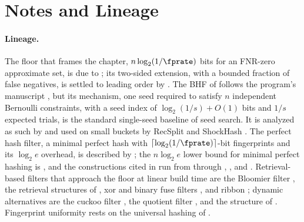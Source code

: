 %

\section{Notes and Lineage}
\label{sec:bib-notes-ch14}

\paragraph{Lineage.}
The floor that frames the chapter, $n \log_2(1/\fprate)$ bits for an
FNR-zero approximate set, is due to \textcite{carter-et-al-1978}; its
two-sided extension, with a bounded fraction of false negatives, is
settled to leading order by \textcite[Prop.~1]{pagh-rodler-2001}. The
BHF of  follows the program's manuscript
\parencite{towell-bernoulli-hash-function}, but its mechanism, one seed
required to satisfy $n$ independent Bernoulli constraints, with a seed
index of $\log_2(1/s) + O(1)$ bits and $1/s$ expected trials, is the
standard single-seed baseline of seed search. It is analyzed as such by
\textcite[Sec.~1.1]{lehmann-et-al-2025} and used on small buckets by
RecSplit and ShockHash
\parencite{esposito-graf-vigna-2020,lehmann-sanders-walzer-2024}. The
perfect hash filter, a minimal perfect hash with
$\lceil \log_2(1/\fprate) \rceil$-bit fingerprints and its $\log_2 e$
overhead, is described by \textcite[Sec.~1]{dietzfelbinger-pagh-2008};
the $n \log_2 e$ lower bound for minimal perfect hashing is
\textcite{fredman-komlos-1984}, and the constructions cited in
 run from \textcite{fredman-komlos-szemeredi-1984}
through \textcite{botelho-pagh-ziviani-2007}, \textcite{belazzougui-2009},
and \textcite{limasset-et-al-2017}. Retrieval-based filters that approach
the floor at linear build time are the Bloomier filter
\parencite{chazelle-et-al-2004}, the retrieval structures of
\textcite{dietzfelbinger-pagh-2008}, xor and binary fuse filters
\parencite{graf-lemire-2020,graf-lemire-2022}, and ribbon
\parencite{dietzfelbinger-et-al-2026-ribbon}; dynamic alternatives are
the cuckoo filter \parencite{fan-cuckoo-2014}, the quotient filter
\parencite{bender-quotient-2012}, and the structure of
\textcite{pagh-pagh-rao-2005}. Fingerprint uniformity rests on the
universal hashing of \textcite{carter-wegman-1979}.

